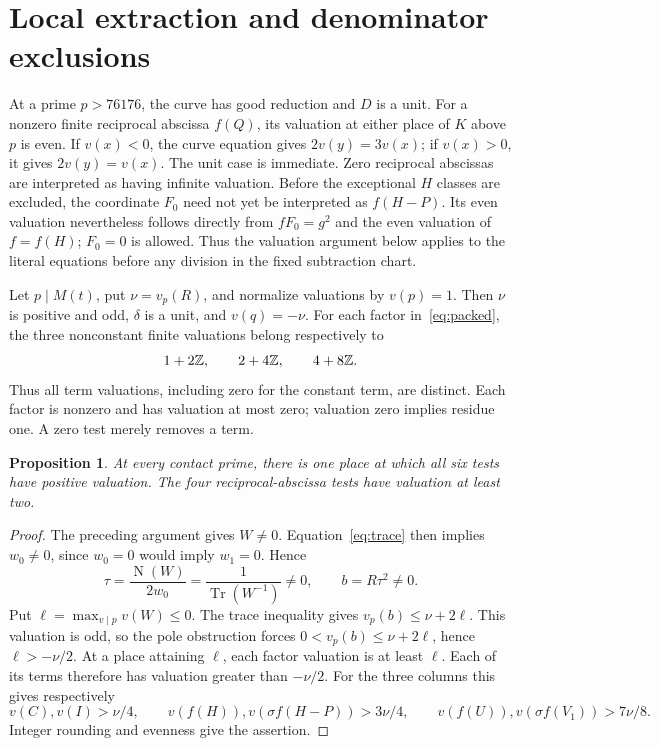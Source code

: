 \documentclass[11pt,a4paper]{article}
\newtheorem{proposition}[theorem]{Proposition}
\DeclareMathOperator{\Tr}{Tr}\DeclareMathOperator{\Nm}{N}
\begin{document}
\section{Local extraction and denominator exclusions}

At a prime $p>76176$, the curve has good reduction and $D$ is a unit.
For a nonzero finite reciprocal abscissa $f(Q)$, its valuation at
either place of $K$ above $p$ is even. If $v(x)<0$, the curve equation
gives $2v(y)=3v(x)$; if $v(x)>0$, it gives $2v(y)=v(x)$.
The unit case is immediate. Zero reciprocal abscissas are interpreted
as having infinite valuation.
Before the exceptional $H$ classes are excluded, the coordinate $F_0$
need not yet be interpreted as $f(H-P)$. Its even valuation nevertheless
follows directly from $fF_0=g^2$ and the even valuation of $f=f(H)$;
$F_0=0$ is allowed. Thus the valuation argument below applies to the
literal equations before any division in the fixed subtraction chart.

Let $p\mid M(t)$, put $\nu=v_p(R)$, and normalize valuations by
$v(p)=1$. Then $\nu$ is positive and odd, $\delta$ is a unit, and
$v(q)=-\nu$. For each factor in~\eqref{eq:packed}, the three
nonconstant finite valuations belong respectively to
\[
                     1+2\mathbb Z,\qquad 2+4\mathbb Z,\qquad4+8\mathbb Z.
\]
Thus all term valuations, including zero for the constant term, are
distinct. Each factor is nonzero and has valuation at most zero;
valuation zero implies residue one. A zero test merely removes a term.

\begin{proposition}\label{prop:local}
At every contact prime, there is one place at which all six tests have
positive valuation. The four reciprocal-abscissa tests have valuation
at least two.
\end{proposition}
\begin{proof}
The preceding argument gives $W\ne0$. Equation~\eqref{eq:trace} then
implies $w_0\ne0$, since $w_0=0$ would imply $w_1=0$. Hence
\[
 \tau=\frac{\Nm(W)}{2w_0}=\frac1{\Tr(W^{-1})}\ne0,
 \qquad b=R\tau^2\ne0.
\]
Put $\ell=\max_{v\mid p}v(W)\le0$. The trace inequality gives
$v_p(b)\le\nu+2\ell$. This valuation is odd, so the pole obstruction
forces $0<v_p(b)\le\nu+2\ell$, hence $\ell>-\nu/2$.
At a place attaining $\ell$, each factor valuation is at least $\ell$.
Each of its terms therefore has valuation greater than $-\nu/2$.
For the three columns this gives respectively
\[
 v(C),v(I)>\nu/4,\qquad
 v(f(H)),v(\sigma f(H-P))>3\nu/4,\qquad
 v(f(U)),v(\sigma f(V_1))>7\nu/8.
\]
Integer rounding and evenness give the assertion.
\end{proof}
\end{document}
